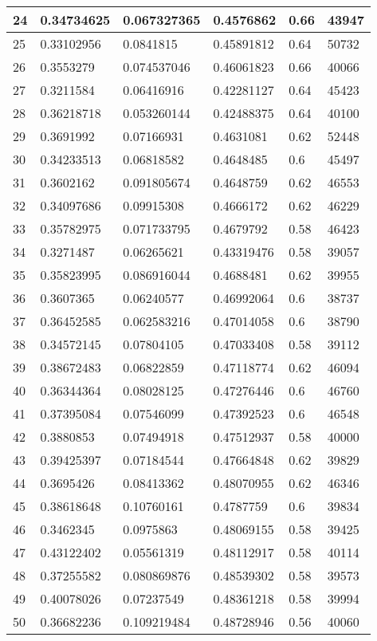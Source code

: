 \begin{longtable}{|l|l|l|l|l|l|}
24 & 0.34734625 & 0.067327365 & 0.4576862 & 0.66 & 43947 \\ \hline 
25 & 0.33102956 & 0.0841815 & 0.45891812 & 0.64 & 50732 \\ \hline 
26 & 0.3553279 & 0.074537046 & 0.46061823 & 0.66 & 40066 \\ \hline 
27 & 0.3211584 & 0.06416916 & 0.42281127 & 0.64 & 45423 \\ \hline 
28 & 0.36218718 & 0.053260144 & 0.42488375 & 0.64 & 40100 \\ \hline 
29 & 0.3691992 & 0.07166931 & 0.4631081 & 0.62 & 52448 \\ \hline 
30 & 0.34233513 & 0.06818582 & 0.4648485 & 0.6 & 45497 \\ \hline 
31 & 0.3602162 & 0.091805674 & 0.4648759 & 0.62 & 46553 \\ \hline 
32 & 0.34097686 & 0.09915308 & 0.4666172 & 0.62 & 46229 \\ \hline 
33 & 0.35782975 & 0.071733795 & 0.4679792 & 0.58 & 46423 \\ \hline 
34 & 0.3271487 & 0.06265621 & 0.43319476 & 0.58 & 39057 \\ \hline 
35 & 0.35823995 & 0.086916044 & 0.4688481 & 0.62 & 39955 \\ \hline 
36 & 0.3607365 & 0.06240577 & 0.46992064 & 0.6 & 38737 \\ \hline 
37 & 0.36452585 & 0.062583216 & 0.47014058 & 0.6 & 38790 \\ \hline 
38 & 0.34572145 & 0.07804105 & 0.47033408 & 0.58 & 39112 \\ \hline 
39 & 0.38672483 & 0.06822859 & 0.47118774 & 0.62 & 46094 \\ \hline 
40 & 0.36344364 & 0.08028125 & 0.47276446 & 0.6 & 46760 \\ \hline 
41 & 0.37395084 & 0.07546099 & 0.47392523 & 0.6 & 46548 \\ \hline 
42 & 0.3880853 & 0.07494918 & 0.47512937 & 0.58 & 40000 \\ \hline 
43 & 0.39425397 & 0.07184544 & 0.47664848 & 0.62 & 39829 \\ \hline 
44 & 0.3695426 & 0.08413362 & 0.48070955 & 0.62 & 46346 \\ \hline 
45 & 0.38618648 & 0.10760161 & 0.4787759 & 0.6 & 39834 \\ \hline 
46 & 0.3462345 & 0.0975863 & 0.48069155 & 0.58 & 39425 \\ \hline 
47 & 0.43122402 & 0.05561319 & 0.48112917 & 0.58 & 40114 \\ \hline 
48 & 0.37255582 & 0.080869876 & 0.48539302 & 0.58 & 39573 \\ \hline 
49 & 0.40078026 & 0.07237549 & 0.48361218 & 0.58 & 39994 \\ \hline 
50 & 0.36682236 & 0.109219484 & 0.48728946 & 0.56 & 40060 \\ \hline 
\end{longtable}